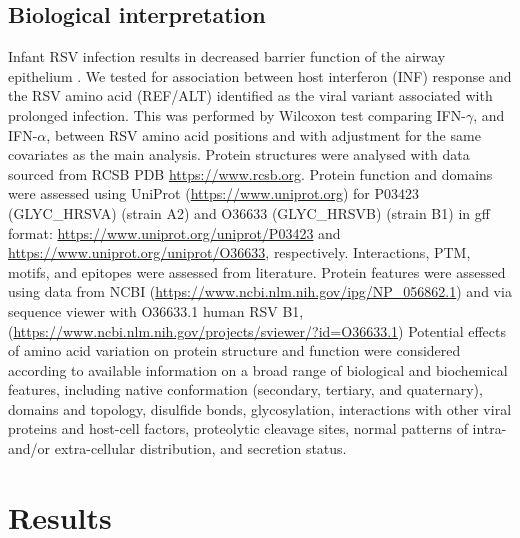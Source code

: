 \documentclass{article} %
\begin{document}
\subsection{Biological interpretation}
Infant RSV infection results in decreased barrier function of the airway epithelium
\citep{connelly2021metabolic}.
We tested for association between host interferon (INF) response and the RSV amino acid (REF/ALT) identified as the viral variant  associated with prolonged infection.
This was performed by Wilcoxon test comparing IFN-$\gamma$, and IFN-$\alpha$, between RSV amino acid positions and with adjustment for the same covariates as the main analysis.
Protein structures were analysed with data sourced from 
RCSB PDB \url{https://www.rcsb.org}.
Protein function and domains were assessed using 
UniProt	(\url{https://www.uniprot.org})
for P03423 (GLYC\_HRSVA) (strain A2) and O36633 (GLYC\_HRSVB) (strain B1) in gff format:
\url{https://www.uniprot.org/uniprot/P03423} and
\url{https://www.uniprot.org/uniprot/O36633}, respectively.
Interactions, PTM, motifs, and epitopes were assessed from literature. 
Protein features were assessed using data from NCBI
(\url{https://www.ncbi.nlm.nih.gov/ipg/NP_056862.1}) and
via sequence viewer with O36633.1 human RSV B1, 
(\url{https://www.ncbi.nlm.nih.gov/projects/sviewer/?id=O36633.1})
Potential effects of amino acid variation on protein structure and function were considered according to available information on a broad range of biological and biochemical features, including native conformation (secondary, tertiary, and quaternary), domains and topology, disulfide bonds, glycosylation, interactions with other viral proteins and host-cell factors, proteolytic cleavage sites, normal patterns of intra- and/or extra-cellular distribution, and secretion status.

\section{Results}
\end{document}
